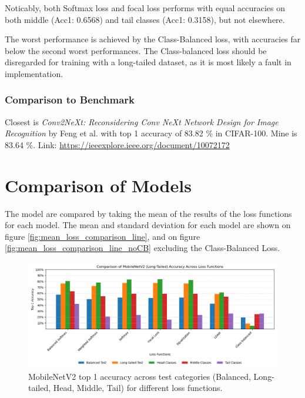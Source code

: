 Noticably, both Softmax loss and focal loss performs with equal accuracies on both middle (Acc1: 0.6568) and tail classes (Acc1: 0.3158), but not elsewhere. 

The worst performance is achieved by the Class-Balanced loss, with accuracies far below the second worst performances. The Class-balanced loss should be disregarded for training with a long-tailed dataset, as it is most likely a fault in implementation. 


\subsubsection{Comparison to Benchmark}
Closest is \textit{Conv2NeXt: Reconsidering Conv NeXt Network Design for Image Recognition} by Feng et al. with top 1 accuracy of 83.82 \% in CIFAR-100. Mine is 83.64 \%.
Link: \url{https://ieeexplore.ieee.org/document/10072172}

\section{Comparison of Models}

The model are compared by taking the mean of the results of the loss functions for each model. The mean and standard deviation for each model are shown on figure \ref{fig:mean_loss_comparison_line}, and on figure \ref{fig:mean_loss_comparison_line_noCB} excluding the Class-Balanced Loss.


\begin{figure}[h!]
    \centering
    \includegraphics[width=\textwidth]{Images/Plots/mobilenet_lt_loss_comparison.png}
    \caption{MobileNetV2 top 1 accuracy across test categories (Balanced, Long-tailed, Head, Middle, Tail) for different loss functions.}
    \label{fig:mobilenet_lt_loss_comparison}
\end{figure}


